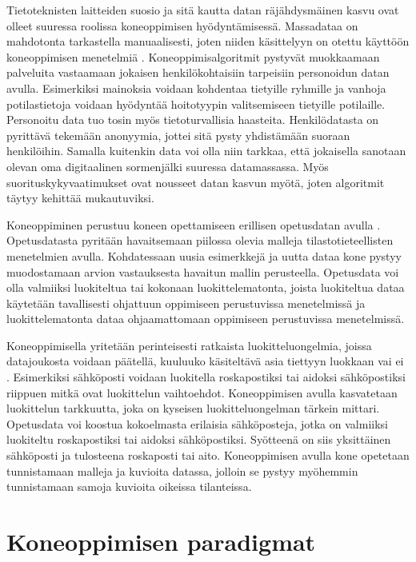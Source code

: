 \documentclass[utf8]{gradu3}
\begin{document}
Tietoteknisten laitteiden suosio ja sitä kautta datan räjähdysmäinen kasvu ovat olleet suuressa roolissa koneoppimisen hyödyntämisessä. Massadataa on mahdotonta tarkastella manuaalisesti, joten niiden käsittelyyn on otettu käyttöön koneoppimisen menetelmiä \parencite{jordan2015machine}. Koneoppimisalgoritmit pystyvät muokkaamaan palveluita vastaamaan jokaisen henkilökohtaisiin tarpeisiin personoidun datan avulla. Esimerkiksi mainoksia voidaan kohdentaa tietyille ryhmille ja vanhoja potilastietoja voidaan hyödyntää hoitotyypin valitsemiseen tietyille potilaille. Personoitu data tuo tosin myös tietoturvallisia haasteita. Henkilödatasta on pyrittävä tekemään anonyymia, jottei sitä pysty yhdistämään suoraan henkilöihin. Samalla kuitenkin data voi olla niin tarkkaa, että jokaisella sanotaan olevan oma digitaalinen sormenjälki suuressa datamassassa. Myös suorituskykyvaatimukset ovat nousseet datan kasvun myötä, joten algoritmit täytyy kehittää mukautuviksi.

Koneoppiminen perustuu koneen opettamiseen erillisen opetusdatan avulla \parencite{das2017survey,jordan2015machine}. Opetusdatasta pyritään havaitsemaan piilossa olevia malleja tilastotieteellisten menetelmien avulla. Kohdatessaan uusia esimerkkejä ja uutta dataa kone pystyy muodostamaan arvion vastauksesta havaitun mallin perusteella. Opetusdata voi olla valmiiksi luokiteltua tai kokonaan luokittelematonta, joista luokiteltua dataa käytetään tavallisesti ohjattuun oppimiseen perustuvissa menetelmissä ja luokittelematonta dataa ohjaamattomaan oppimiseen perustuvissa menetelmissä.

Koneoppimisella yritetään perinteisesti ratkaista luokitteluongelmia, joissa datajoukosta voidaan päätellä, kuuluuko käsiteltävä asia tiettyyn luokkaan vai ei \parencite{jordan2015machine}. Esimerkiksi sähköposti voidaan luokitella roskapostiksi tai aidoksi sähköpostiksi riippuen mitkä ovat luokittelun vaihtoehdot. Koneoppimisen avulla kasvatetaan luokittelun tarkkuutta, joka on kyseisen luokitteluongelman tärkein mittari. Opetusdata voi koostua kokoelmasta erilaisia sähköposteja, jotka on valmiiksi luokiteltu roskapostiksi tai aidoksi sähköpostiksi. Syötteenä on siis yksittäinen sähköposti ja tulosteena roskaposti tai aito. Koneoppimisen avulla kone opetetaan tunnistamaan malleja ja kuvioita datassa, jolloin se pystyy myöhemmin tunnistamaan samoja kuvioita oikeissa tilanteissa.

\section{Koneoppimisen paradigmat}
\end{document}
